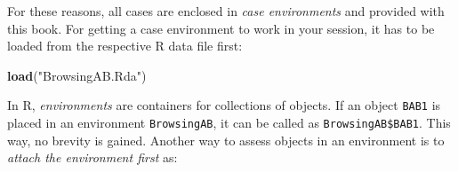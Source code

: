 \documentclass[]{svmono}
\newenvironment{Shaded}{\begin{snugshade}}{\end{snugshade}}
\newcommand{\KeywordTok}[1]{\textcolor[rgb]{0.13,0.29,0.53}{\textbf{#1}}}
\newcommand{\StringTok}[1]{\textcolor[rgb]{0.31,0.60,0.02}{#1}}
\newcommand{\OperatorTok}[1]{\textcolor[rgb]{0.81,0.36,0.00}{\textbf{#1}}}
\newcommand{\NormalTok}[1]{#1}
\theoremstyle{definition}
\theoremstyle{definition}
\theoremstyle{definition}
\theoremstyle{remark}
\begin{document}
For these reasons, all cases are enclosed in \emph{case environments}
and provided with this book. For getting a case environment to work in
your session, it has to be loaded from the respective R data file first:

\begin{Shaded}
\begin{Highlighting}[]
\KeywordTok{load}\NormalTok{(}\StringTok{"BrowsingAB.Rda"}\NormalTok{)}
\end{Highlighting}
\end{Shaded}

In R, \emph{environments} are containers for collections of objects. If
an object \texttt{BAB1} is placed in an environment \texttt{BrowsingAB},
it can be called as \texttt{BrowsingAB\$BAB1}. This way, no brevity is
gained. Another way to assess objects in an environment is to
\emph{attach the environment first} as:

\begin{Shaded}
\end{Shaded}
\end{document}
